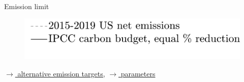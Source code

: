 \documentclass[11pt,aspectratio=169]{beamer}
\begin{document}
\begin{frame}{Emission limit}
\begin{center}
		\begin{minipage}{0.3\textwidth}
			\begin{figure}
				\includegraphics[width=1.4\textwidth]{../codding_model/own_basedOnFried/optimalPol_010922_revision/figures/all_13Sept22_Tplus30/Emnet_goals_o0_lgd1_crop.png}
			\end{figure}
		\end{minipage}
	\end{center}

\vspace{-1.7mm}
\hfill	\hyperlink{emsall}{\tiny{$\rightarrow$ alternative emission targets,}} 		\hyperlink{calib}{\tiny{$\rightarrow$ parameters}}
\end{frame}

	\hypertarget{resback}{}
\end{document}
